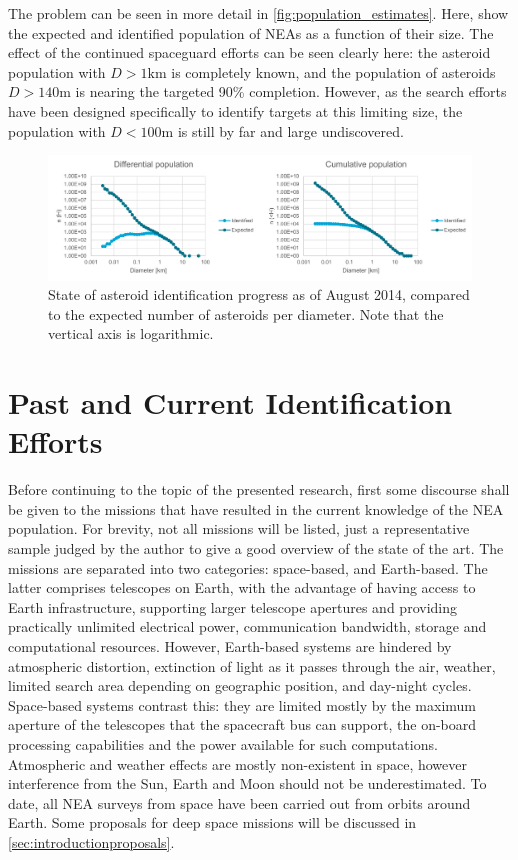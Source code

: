 The problem can be seen in more detail in \autoref{fig:population_estimates}. Here, \cite{HarrisPopulation} show the expected and identified population of NEAs as a function of their size. The effect of the continued spaceguard efforts can be seen clearly here: the asteroid population with $D > 1 \mathrm{km}$ is completely known, and the population of asteroids $D > 140 \mathrm{m}$ is nearing the targeted 90\% completion. However, as the search efforts have been designed specifically to identify targets at this limiting size, the population with $D < 100 \mathrm{m}$ is still by far and large undiscovered.

\begin{figure}[htbp]
 \centering
 \includegraphics[width=1.0\textwidth]{img/population_estimates.pdf}
 \caption{State of asteroid identification progress as of August 2014, compared to the expected number of asteroids per diameter. Note that the vertical axis is logarithmic. \cite{HarrisPopulation}}
 \label{fig:population_estimates}
\end{figure}


\section{Past and Current Identification Efforts}
\label{sec:introductionidentification}

Before continuing to the topic of the presented research, first some discourse shall be given to the missions that have resulted in the current knowledge of the NEA population. For brevity, not all missions will be listed, just a representative sample judged by the author to give a good overview of the state of the art. The missions are separated into two categories: space-based, and Earth-based. The latter comprises telescopes on Earth, with the advantage of having access to Earth infrastructure, supporting larger telescope apertures and providing practically unlimited electrical power, communication bandwidth, storage and computational resources. However, Earth-based systems are hindered by atmospheric distortion, extinction of light as it passes through the air, weather, limited search area depending on geographic position, and day-night cycles. Space-based systems contrast this: they are limited mostly by the maximum aperture of the telescopes that the spacecraft bus can support, the on-board processing capabilities and the power available for such computations. Atmospheric and weather effects are mostly non-existent in space, however interference from the Sun, Earth and Moon should not be underestimated. To date, all NEA surveys from space have been carried out from orbits around Earth. Some proposals for deep space missions will be discussed in \autoref{sec:introductionproposals}.\\

